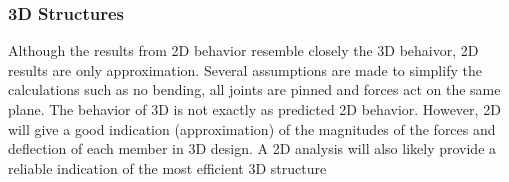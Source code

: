 \subsubsection{3D Structures}


Although the results from 2D behavior resemble closely the 3D behaivor, 2D results are only approximation.
Several assumptions are made to simplify the calculations such as no bending, all joints are pinned and forces act on the same plane. 
The behavior of 3D is not exactly as predicted 2D behavior. However, 2D will give a good indication (approximation) of the magnitudes of the forces and deflection of each member in 3D design.
A 2D analysis will also likely provide a reliable indication of the most efficient 3D structure